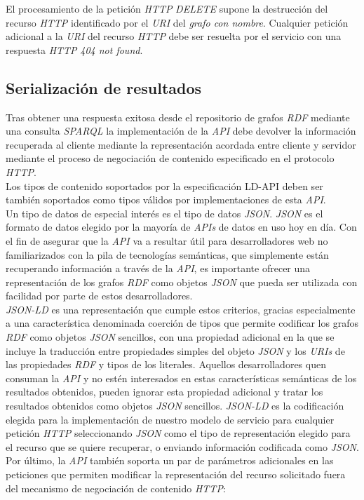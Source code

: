 El procesamiento de la petici\'on \textit{HTTP} \textit{DELETE} supone la destrucci\'on del recurso \textit{HTTP} identificado por el \textit{URI} del \textit{grafo con nombre}. Cualquier petici\'on adicional a la \textit{URI} del recurso \textit{HTTP} debe ser resuelta por el servicio con una respuesta \textit{HTTP} \textit{404 not found}.

\subsection{Serializaci\'on de resultados}

Tras obtener una respuesta exitosa desde el repositorio de grafos \textit{RDF} mediante una consulta \textit{SPARQL} la implementaci\'on de la \textit{API} debe devolver la informaci\'on recuperada al cliente mediante la representaci\'on acordada entre cliente y servidor mediante el proceso de negociaci\'on de contenido especificado en el protocolo \textit{HTTP}.\\
Los tipos de contenido soportados por la especificaci\'on LD-API deben ser tambi\'en soportados como tipos v\'alidos por implementaciones de esta \textit{API}.\\
Un tipo de datos de especial inter\'es es el tipo de datos \textit{JSON}. \textit{JSON} es el formato de datos elegido por la mayor\'ia de \textit{APIs} de datos en uso hoy en d\'ia. Con el fin de asegurar que la \textit{API} va a resultar \'util para desarrolladores web no familiarizados con la pila de tecnolog\'ias sem\'anticas, que simplemente est\'an recuperando informaci\'on a trav\'es de la \textit{API}, es importante ofrecer una representaci\'on de los grafos \textit{RDF} como objetos \textit{JSON} que pueda ser utilizada con facilidad por parte de estos desarrolladores.\\
\textit{JSON-LD} \cite{jsonld} es una representaci\'on que cumple estos criterios, gracias especialmente a una caracter\'istica denominada coerci\'on de tipos que permite codificar los grafos \textit{RDF} como objetos \textit{JSON} sencillos, con una propiedad adicional en la que se incluye la traducci\'on entre propiedades simples del objeto \textit{JSON} y los \textit{URIs} de las propiedades \textit{RDF} y tipos de los literales. Aquellos desarrolladores quen consuman la \textit{API} y no est\'en interesados en estas caracter\'isticas sem\'anticas de los resultados obtenidos, pueden ignorar esta propiedad adicional y tratar los resultados obtenidos como objetos \textit{JSON} sencillos. \textit{JSON-LD} es la codificaci\'on elegida para la implementaci\'on de nuestro modelo de servicio para cualquier petici\'on \textit{HTTP} seleccionando \textit{JSON} como el tipo de representaci\'on elegido para el recurso que se quiere recuperar, o enviando informaci\'on codificada como \textit{JSON}.\\
Por \'ultimo, la \textit{API} tambi\'en soporta un par de par\'ametros adicionales en las peticiones que permiten modificar la representaci\'on del recurso solicitado fuera del mecanismo de negociaci\'on de contenido \textit{HTTP}:

